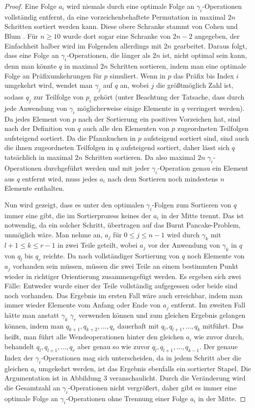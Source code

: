 \documentclass[a4paper, 10pt, ngerman]{article}
\begin{document}
\begin{proof}
    Eine Folge $a_i$ wird niemals durch eine optimale Folge an $\gamma_i$-Operationen vollständig entfernt, da eine vorzeichenbehaftete Permutation in maximal $2n$ Schritten sortiert werden kann. Diese obere Schranke stammt von Cohen und Blum \cite{burntpancakes}. Für $n \ge 10$ wurde dort sogar eine Schranke von $2n - 2$ angegeben, der Einfachheit halber wird im Folgenden allerdings mit $2n$ gearbeitet. Daraus folgt, dass eine Folge an $\gamma_i$-Operationen, die länger als $2n$ ist, nicht optimal sein kann, denn man könnte $q$ in maximal $2n$ Schritten sortieren, indem man eine optimale Folge an Präfixumkehrungen für $p$ simuliert. Wenn in $p$ das Präfix bis Index $i$ umgekehrt wird, wendet man $\gamma_j$ auf $q$ an, wobei $j$ die größtmöglich Zahl ist, sodass $q_j$ zur Teilfolge von $p_i$ gehört (unter Beachtung der Tatsache, dass durch jede Anwendung von $\gamma_i$ möglicherweise einige Elemente in $q$ verringert werden). Da jedes Element von $p$ nach der Sortierung ein positives Vorzeichen hat, sind nach der Definition von $q$ auch alle den Elementen von $p$ zugeordneten Teilfolgen aufsteigend sortiert. Da die Pfannkuchen in $p$ aufsteigend sortiert sind, sind auch die ihnen zugeordneten Teilfolgen in $q$ aufsteigend sortiert, daher lässt sich $q$ tatsächlich in maximal $2n$ Schritten sortieren. Da also maximal $2n$ $\gamma_i$-Operationen durchgeführt werden und mit jeder $\gamma_i$-Operation genau ein Element aus $q$ entfernt wird, muss jedes $a_i$ nach dem Sortieren noch mindestens $n$ Elemente enthalten.

    Nun wird gezeigt, dass es unter den optimalen $\gamma_i$-Folgen zum Sortieren von $q$ immer eine gibt, die im Sortierprozess keines der $a_i$ in der Mitte trennt. Das ist notwendig, da ein solcher Schritt, übertragen auf das Burnt Pancake-Problem, unmöglich wäre. Man nehme an, $a_j$ für $0 \le j \le n - 1$ wird durch $\gamma_k$ mit $l + 1 \le k \le r-1$ in zwei Teile geteilt, wobei $a_j$ vor der Anwendung von $\gamma_k$ in $q$ von $q_l$ bis $q_r$ reichte. Da nach vollständiger Sortierung von $q$ noch Elemente von $a_j$ vorhanden sein müssen, müssen die zwei Teile an einem bestimmten Punkt wieder in richtiger Orientierung zusammengefügt werden. Es ergeben sich zwei Fälle: Entweder wurde einer der Teile vollständig aufgegessen oder beide sind noch vorhanden. Das Ergebnis im ersten Fall wäre auch erreichbar, indem man immer wieder Elemente vom Anfang oder Ende von $a_j$ entfernt. Im zweiten Fall hätte man anstatt $\gamma_k$ $\gamma_r$ verwenden können und zum gleichen Ergebnis gelangen können, indem man $q_{k + 1}, q_{k + 2}, \dots, q_r$ dauerhaft mit $q_l, q_{l+1}, \dots, q_{k}$ mitführt. Das heißt, man führt alle Wendeoperationen hinter den gleichen $a_i$ wie zuvor durch, behandelt $q_l, q_{l+1}, \dots, q_r$ aber genau so wie zuvor $q_l, q_{l+1}, \dots, q_{k-1}$. Der genaue Index der $\gamma_i$-Operationen mag sich unterscheiden, da in jedem Schritt aber die gleichen $a_i$ umgekehrt werden, ist das Ergebnis ebenfalls ein sortierter Stapel. Die Argumentation ist in Abbildung 3 veranschaulicht. Durch die Veränderung wird die Gesamtzahl an $\gamma_i$-Operationen nicht vergrößert, daher gibt es immer eine optimale Folge an $\gamma_i$-Operationen ohne Trennung einer Folge $a_i$ in der Mitte.


\end{proof}
\end{document}

